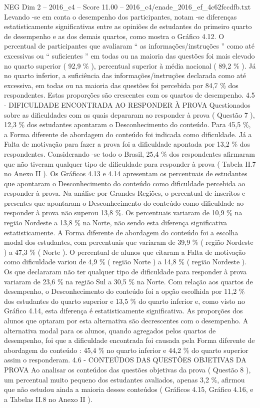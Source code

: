 \begin{textsample}{NEG Dim 2 – 2016\_c4 – Score 11.00 – 2016\_c4/enade\_2016\_ef\_4c62fccdfb.txt}
Levando -se em conta o desempenho dos participantes, notam -se diferenças estatisticamente significativas entre as opiniões de estudantes do primeiro quarto de desempenho e as dos demais quartos, como mostra o Gráfico 4.12.
O percentual de participantes que avaliaram “ as informações/instruções ” como até excessivas ou “ suficientes ” em todas ou na maioria das questões foi mais elevado no quarto superior ( 92,9 \% ), percentual superior à média nacional ( 89,2 \% ).
Já no quarto inferior, a suficiência das informações/instruções declarada como até excessiva, em todas ou na maioria das questões foi percebida por 84,7 \% dos respondentes.
Estas proporções são crescentes com os quartos de desempenho. 4.5 - DIFICULDADE ENCONTRADA AO RESPONDER À PROVA Questionados sobre as dificuldades com as quais depararam ao responder à prova ( Questão 7 ), 12,3 \% dos estudantes apontaram o Desconhecimento do conteúdo.
Para 45,5 \%, a Forma diferente de abordagem do conteúdo foi indicada como dificuldade.
Já a Falta de motivação para fazer a prova foi a dificuldade apontada por 13,2 \% dos respondentes.
Considerando -se todo o Brasil, 25,4 \% dos respondentes afirmaram que não tiveram qualquer tipo de dificuldade para responder à prova ( Tabela II.7 no Anexo II ).
Os Gráficos 4.13 e 4.14 apresentam os percentuais de estudantes que apontaram o Desconhecimento do conteúdo como dificuldade percebida ao responder à prova.
Na análise por Grandes Regiões, o percentual de inscritos e presentes que apontaram o Desconhecimento do conteúdo como dificuldade ao responder à prova não superou 13,8 \%.
Os percentuais variaram de 10,9 \% na região Nordeste a 13,8 \% na Norte, não sendo esta diferença significativa estatisticamente.
A Forma diferente de abordagem do conteúdo foi a escolha modal dos estudantes, com percentuais que variaram de 39,9 \% ( região Nordeste ) a 47,3 \% ( Norte ).
O percentual de alunos que citaram a Falta de motivação como dificuldade variou de 4,9 \% ( região Norte ) a 14,8 \% ( região Nordeste ).
Os que declararam não ter qualquer tipo de dificuldade para responder à prova variaram de 23,6 \% na região Sul a 30,5 \% na Norte.
Com relação aos quartos de desempenho, o Desconhecimento do conteúdo foi a opção escolhida por 11,2 \% dos estudantes do quarto superior e 13,5 \% do quarto inferior e, como visto no Gráfico 4.14, esta diferença é estatisticamente significativa.
As proporções dos alunos que optaram por esta alternativa são decrescentes com o desempenho.
A alternativa modal para os alunos, quando agregados pelos quartos de desempenho, foi que a dificuldade encontrada foi causada pela Forma diferente de abordagem do conteúdo : 45,4 \% no quarto inferior e 44,2 \% do quarto superior assim o responderam. 4.6 - CONTEÚDOS DAS QUESTÕES OBJETIVAS DA PROVA Ao analisar os conteúdos das questões objetivas da prova ( Questão 8 ), um percentual muito pequeno dos estudantes avaliados, apenas 3,2 \%, afirmou que não estudou ainda a maioria desses conteúdos ( Gráficos 4.15, Gráfico 4.16, e a Tabelas II.8 no Anexo II ).

\end{textsample}
